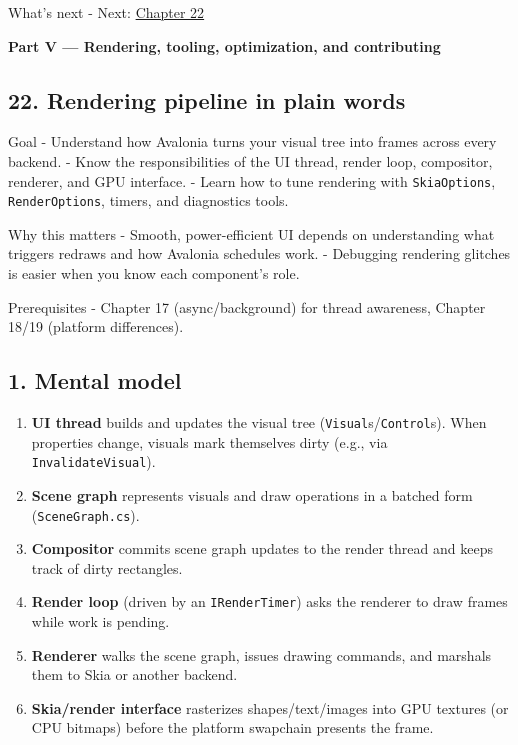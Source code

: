 What's next - Next: \href{Chapter22.md}{Chapter 22}

\clearpage
{}
{}
\thispagestyle{empty}
\vspace*{\fill}
\begin{center}
{\Huge\bfseries Part V — Rendering, tooling, optimization, and contributing}
\end{center}
\vspace*{\fill}
\clearpage

\newpage

\subsection{22. Rendering pipeline in plain
words}\label{rendering-pipeline-in-plain-words}

Goal - Understand how Avalonia turns your visual tree into frames across
every backend. - Know the responsibilities of the UI thread, render
loop, compositor, renderer, and GPU interface. - Learn how to tune
rendering with \passthrough{\lstinline!SkiaOptions!},
\passthrough{\lstinline!RenderOptions!}, timers, and diagnostics tools.

Why this matters - Smooth, power-efficient UI depends on understanding
what triggers redraws and how Avalonia schedules work. - Debugging
rendering glitches is easier when you know each component's role.

Prerequisites - Chapter 17 (async/background) for thread awareness,
Chapter 18/19 (platform differences).

\subsection{1. Mental model}\label{mental-model}

\begin{enumerate}
\def\labelenumi{\arabic{enumi}.}
\tightlist
\item
  \textbf{UI thread} builds and updates the visual tree
  (\passthrough{\lstinline!Visual!}s/\passthrough{\lstinline!Control!}s).
  When properties change, visuals mark themselves dirty (e.g., via
  \passthrough{\lstinline!InvalidateVisual!}).
\item
  \textbf{Scene graph} represents visuals and draw operations in a
  batched form (\passthrough{\lstinline!SceneGraph.cs!}).
\item
  \textbf{Compositor} commits scene graph updates to the render thread
  and keeps track of dirty rectangles.
\item
  \textbf{Render loop} (driven by an
  \passthrough{\lstinline!IRenderTimer!}) asks the renderer to draw
  frames while work is pending.
\item
  \textbf{Renderer} walks the scene graph, issues drawing commands, and
  marshals them to Skia or another backend.
\item
  \textbf{Skia/render interface} rasterizes shapes/text/images into GPU
  textures (or CPU bitmaps) before the platform swapchain presents the
  frame.
\end{enumerate}

